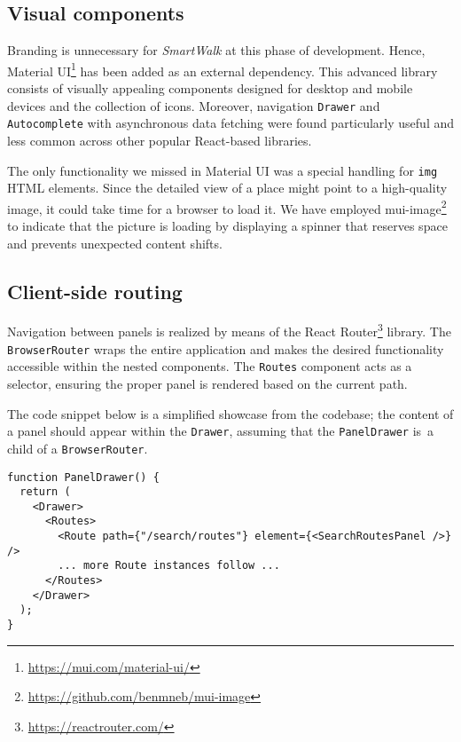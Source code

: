 \subsection{Visual components}

Branding is unnecessary for \emph{SmartWalk} at this phase of development. Hence, Material UI\footnote{\href{https://mui.com/material-ui/}{https://mui.com/material-ui/}} has been added as an external dependency. This advanced library consists of visually appealing components designed for desktop and mobile devices and the collection of icons. Moreover, navigation \texttt{Drawer} and \texttt{Autocomplete} with asynchronous data fetching were found particularly useful and less common across other popular React-based libraries.

The only functionality we missed in Material UI was a special handling for \texttt{img} HTML elements. Since the detailed view of a place might point to a high-quality image, it could take time for a browser to load it. We have employed mui-image\footnote{\href{https://github.com/benmneb/mui-image}{https://github.com/benmneb/mui-image}} to indicate that the picture is loading by displaying a spinner that reserves space and prevents unexpected content shifts.

\subsection{Client-side routing}

Navigation between panels is realized by means of the React Router\footnote{\href{https://reactrouter.com/}{https://reactrouter.com/}} library. The \texttt{BrowserRouter} wraps the entire application and makes the desired functionality accessible within the nested components. The \texttt{Routes} component acts as a selector, ensuring the proper panel is rendered based on the current path.

The code snippet below is a simplified showcase from the codebase; the content of a panel should appear within the \texttt{Drawer}, assuming that the \texttt{PanelDrawer} is~a child of a \texttt{BrowserRouter}.

\begin{verbatim}
function PanelDrawer() {
  return (
    <Drawer>
      <Routes>
        <Route path={"/search/routes"} element={<SearchRoutesPanel />} />
        ... more Route instances follow ...
      </Routes>
    </Drawer>
  );
}
\end{verbatim}


